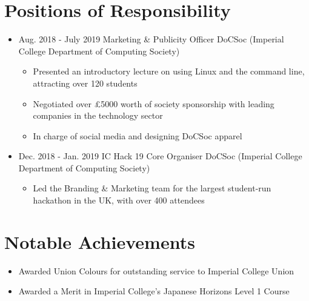 \documentclass[11pt,a4paper,sans]{moderncv}        %
\begin{document}
\section{Positions of Responsibility}

\begin{itemize}

\item{
\cventry
{Aug. 2018 - July 2019}
{Marketing \& Publicity Officer}
{DoCSoc (Imperial College Department of Computing Society)}
{}{}{
\begin{itemize}
\item Presented an introductory lecture on using Linux and the command line, attracting over 120 students
\item Negotiated over £5000 worth of society sponsorship with leading companies in the technology sector
\item In charge of social media and designing DoCSoc apparel
\end{itemize}
}}

\item{
\cventry
{Dec. 2018 - Jan. 2019}
{IC Hack 19 Core Organiser}
{DoCSoc (Imperial College Department of Computing Society)}
{}{}{
\begin{itemize}
\item Led the Branding \& Marketing team for the largest student-run hackathon in the UK, with over 400 attendees
\end{itemize}
}}

\end{itemize}

\section{Notable Achievements}

\begin{itemize}

\item Awarded Union Colours for outstanding service to Imperial College Union

\item Awarded a Merit in Imperial College's Japanese Horizons Level 1 Course

\end{itemize}

\nocite{*}

\end{document}
